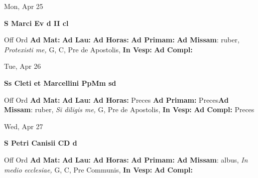 \documentclass[10pt]{memoir}
\begin{document}
\begin{center}
\begin{minipage}{3.5in}
\vspace{2em}
\begin{center}Mon, Apr 25
\end{center}
\textbf{ \large S Marci Ev
\textnormal{\normalsize d II cl}}

\begin{justify}Off Ord
\textbf{Ad Mat: }
\textbf{Ad Lau: }
\textbf{Ad Horas: }
\textbf{Ad Primam: }\textbf{Ad Missam}: ruber, \textit{Protexisti me,} G, C, Pre de Apostolis, 
\textbf{In Vesp: }
\textbf{Ad Compl: }
\end{justify}
\end{minipage}
\end{center}

\begin{center}
\begin{minipage}{3.5in}
\vspace{2em}
\begin{center}Tue, Apr 26
\end{center}
\textbf{ \large Ss Cleti et Marcellini PpMm
\textnormal{\normalsize sd}}

\begin{justify}Off Ord
\textbf{Ad Mat: }
\textbf{Ad Lau: }
\textbf{Ad Horas: }Preces
\textbf{Ad Primam: }Preces\textbf{Ad Missam}: ruber, \textit{Si diligis me,} G, Pre de Apostolis, 
\textbf{In Vesp: }
\textbf{Ad Compl: }Preces
\end{justify}
\end{minipage}
\end{center}

\begin{center}
\begin{minipage}{3.5in}
\vspace{2em}
\begin{center}Wed, Apr 27
\end{center}
\textbf{ \large S Petri Canisii CD
\textnormal{\normalsize d}}

\begin{justify}Off Ord
\textbf{Ad Mat: }
\textbf{Ad Lau: }
\textbf{Ad Horas: }
\textbf{Ad Primam: }\textbf{Ad Missam}: albus, \textit{In medio ecclesiae,} G, C, Pre Communis, 
\textbf{In Vesp: }
\textbf{Ad Compl: }
\end{justify}
\end{minipage}
\end{center}
\end{document}
